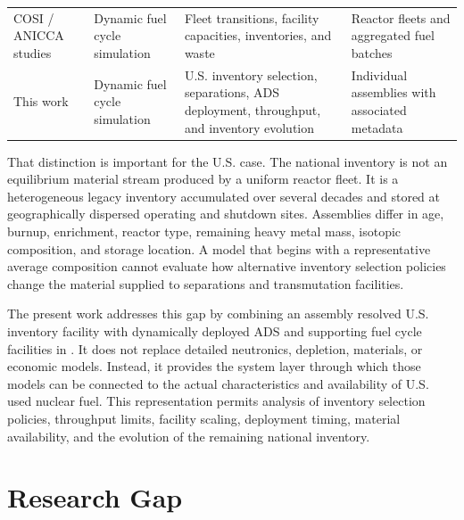 \begin{table}[htbp]
\begin{tabularx}{\textwidth}{@{}p{2.0cm}p{2.3cm}Xp{2.5cm}@{}}
        \gls{COSI} / \gls{ANICCA} studies
        & Dynamic fuel cycle simulation
        & Fleet transitions, facility capacities, inventories, and waste
        & Reactor fleets and aggregated fuel batches \\

        This work
        & Dynamic fuel cycle simulation
        & U.S. inventory selection, separations, \gls{ADS} deployment,
          throughput, and inventory evolution
        & Individual assemblies with associated metadata \\
        \bottomrule
    \end{tabularx}
\end{table}

That distinction is important for the U.S. case. The national inventory is
not an equilibrium material stream produced by a uniform reactor fleet. It is
a heterogeneous legacy inventory accumulated over several decades and stored
at geographically dispersed operating and shutdown sites. Assemblies differ
in age, burnup, enrichment, reactor type, remaining heavy metal mass, isotopic
composition, and storage location. A model that begins with a representative
average composition cannot evaluate how alternative inventory selection
policies change the material supplied to separations and transmutation
facilities.

The present work addresses this gap by combining an assembly resolved U.S.
inventory facility with dynamically deployed \gls{ADS} and supporting fuel cycle
facilities in \Cyclus. It does not replace detailed neutronics, depletion,
materials, or economic models. Instead, it provides the system layer through
which those models can be connected to the actual characteristics and
availability of U.S. used nuclear fuel. This representation permits analysis
of inventory selection policies, throughput limits, facility scaling,
deployment timing, material availability, and the evolution of the remaining
national inventory.



\section{Research Gap}
\label{sec:gap}


